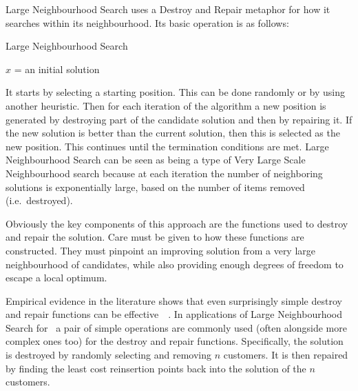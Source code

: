 Large Neighbourhood Search uses a Destroy and Repair metaphor for how it searches within its neighbourhood. Its basic operation is as follows:

\begin{algorithm}[H]
   \caption{Large Neighbourhood Search}
   $x$ = an initial solution\\
\end{algorithm}

It starts by selecting a starting position. This can be done randomly or by using another heuristic. Then for each iteration of the algorithm a new position is generated by destroying part of the candidate solution and then by repairing it. If the new solution is better than the current solution, then this is selected as the new position. This continues until the termination conditions are met. Large Neighbourhood Search can be seen as being a type of Very Large Scale Neighbourhood search because at each iteration the number of neighboring solutions is exponentially large, based on the number of items removed (i.e.~destroyed).

Obviously the key components of this approach are the functions used to destroy and repair the solution. Care must be given to how these functions are constructed. They must pinpoint an improving solution from a very large neighbourhood of candidates, while also providing enough degrees of freedom to escape a local optimum.

Empirical evidence in the literature shows that even surprisingly simple destroy and repair functions can be effective~\cite{Shaw:1998}~\cite{Ropke:2005}. In applications of Large Neighbourhood Search for \VRP\ a pair of simple operations are commonly used (often alongside more complex ones too) for the destroy and repair functions. Specifically, the solution is destroyed by randomly selecting and removing $n$ customers. It is then repaired by finding the least cost reinsertion points back into the solution of the $n$ customers.

